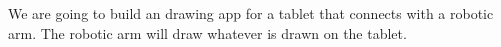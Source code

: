 We are going to build an drawing app for a tablet that connects with a robotic arm. The robotic arm will draw whatever is drawn on the tablet.